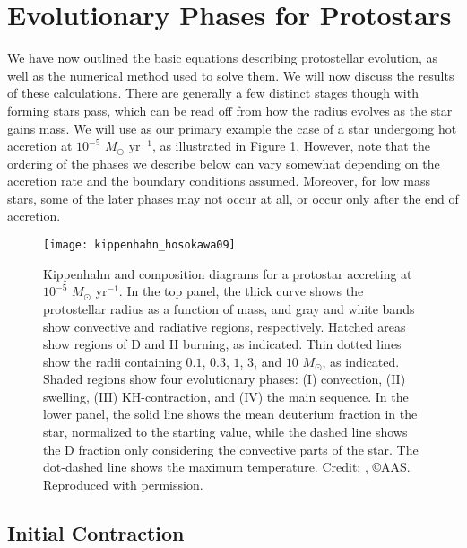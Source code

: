 \section{Evolutionary Phases for Protostars}

We have now outlined the basic equations describing protostellar evolution, as well as the numerical method used to solve them. We will now discuss the results of these calculations. There are generally a few distinct stages though with forming stars pass, which can be read off from how the radius evolves as the star gains mass. We will use as our primary example the case of a star undergoing hot accretion at $10^{-5}$ $M_\odot$ yr$^{-1}$, as illustrated in Figure \ref{fig:kippenhahn_hosokawa09}. However, note that the ordering of the phases we describe below can vary somewhat depending on the accretion rate and the boundary conditions assumed. Moreover, for low mass stars, some of the later phases may not occur at all, or occur only after the end of accretion.

\begin{figure}
\texttt{[image: kippenhahn\_hosokawa09]}
\caption[Kippenhahn diagram for an accretion protostar]{
\label{fig:kippenhahn_hosokawa09}
Kippenhahn and composition diagrams for a protostar accreting at $10^{-5}$ $M_\odot$ yr$^{-1}$. In the top panel, the thick curve shows the protostellar radius as a function of mass, and gray and white bands show convective and radiative regions, respectively. Hatched areas show regions of D and H burning, as indicated. Thin dotted lines show the radii containing $0.1$, $0.3$, $1$, $3$, and $10$ $M_\odot$, as indicated. Shaded regions show four evolutionary phases: (I) convection, (II) swelling, (III) KH-contraction, and (IV) the main sequence. In the lower panel, the solid line shows the mean deuterium fraction in the star, normalized to the starting value, while the dashed line shows the D fraction only considering the convective parts of the star. The dot-dashed line shows the maximum temperature. Credit: \citet{hosokawa09a}, \copyright AAS. Reproduced with permission.
}
\end{figure}

\subsection{Initial Contraction}

